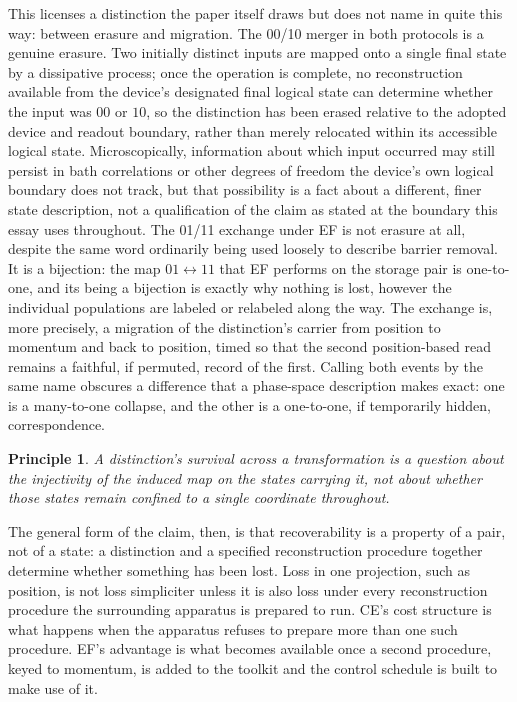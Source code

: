 \documentclass[11pt]{article}
\newtheorem{principle}{Principle}
\begin{document}
This licenses a distinction the paper itself draws but does not name in quite this way: between erasure and migration. The 00/10 merger in both protocols is a genuine erasure. Two initially distinct inputs are mapped onto a single final state by a dissipative process; once the operation is complete, no reconstruction available from the device's designated final logical state can determine whether the input was $00$ or $10$, so the distinction has been erased relative to the adopted device and readout boundary, rather than merely relocated within its accessible logical state. Microscopically, information about which input occurred may still persist in bath correlations or other degrees of freedom the device's own logical boundary does not track, but that possibility is a fact about a different, finer state description, not a qualification of the claim as stated at the boundary this essay uses throughout. The 01/11 exchange under EF is not erasure at all, despite the same word ordinarily being used loosely to describe barrier removal. It is a bijection: the map $01\leftrightarrow11$ that EF performs on the storage pair is one-to-one, and its being a bijection is exactly why nothing is lost, however the individual populations are labeled or relabeled along the way. The exchange is, more precisely, a migration of the distinction's carrier from position to momentum and back to position, timed so that the second position-based read remains a faithful, if permuted, record of the first. Calling both events by the same name obscures a difference that a phase-space description makes exact: one is a many-to-one collapse, and the other is a one-to-one, if temporarily hidden, correspondence.

\begin{principle}
A distinction's survival across a transformation is a question about the injectivity of the induced map on the states carrying it, not about whether those states remain confined to a single coordinate throughout.
\end{principle}

The general form of the claim, then, is that recoverability is a property of a pair, not of a state: a distinction and a specified reconstruction procedure together determine whether something has been lost. Loss in one projection, such as position, is not loss simpliciter unless it is also loss under every reconstruction procedure the surrounding apparatus is prepared to run. CE's cost structure is what happens when the apparatus refuses to prepare more than one such procedure. EF's advantage is what becomes available once a second procedure, keyed to momentum, is added to the toolkit and the control schedule is built to make use of it.
\end{document}
